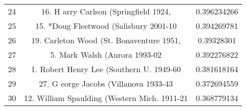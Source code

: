 \documentclass{mcmthesis}
\begin{document}
\begin{appendices}
\begin{longtable}{ccc}
    24    & 16. H arry Carlson (Springfield 1924, & 0.396234266 \\
    25    & 15. *Doug Fleetwood (Salisbury 2001-10 & 0.394269781 \\
    26    & 19. Carleton Wood (St. Bonaventure 1951, & 0.39328301 \\
    27    & 5. Mark Walsh (Aurora 1993-02 & 0.392276822 \\
    28    & 1. Robert Henry Lee (Southern U. 1949-60 & 0.381618164 \\
    29    & 27. G eorge Jacobs (Villanova 1933-43 & 0.372694559 \\
    30    & 12. William Spaulding (Western Mich. 1911-21 & 0.368779134 \\
\end{longtable}




\end{appendices}
\end{document}
